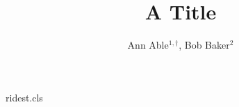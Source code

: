 \begin{filecontents*}[overwrite]{ridest.cls}
\renewcommand{\author}[1]{{\raggedright #1\par}}
\newcommand{\affil}[1]{{\small\raggedright #1}}
\end{filecontents*}
\documentclass{ridest}

\title{A Title}
\author{Ann Able$^{1,\dagger}$, Bob Baker$^{2}$}




\maketitle
Text.

